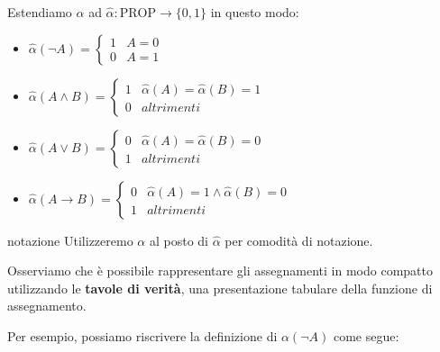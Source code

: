 \documentclass[a4paper,11pt]{report}
\begin{document}
    Estendiamo \( \alpha \) ad \( \hat{\alpha} : \text{PROP} \to \{0,1\} \) in questo modo:
            \vspace{0.5em}
    \begin{itemize}
        \item \( \hat{\alpha}(\neg A) = \begin{cases}
                1 &  A = 0 \\
                0 & A = 1
            \end{cases}\)

            \vspace{0.5em}

        \item \( \hat{\alpha}(A \land B) = \begin{cases}
                1 & \hat{\alpha}(A) = \hat{\alpha}(B)  = 1 \\
                0 & altrimenti
            \end{cases}\)

            \vspace{0.5em}

        \item \( \hat{\alpha}(A \lor B) = \begin{cases}
                0 & \hat{\alpha}(A) = \hat{\alpha}(B)  = 0 \\
                1 & altrimenti
            \end{cases}\)

            \vspace{0.5em}

        \item \( \hat{\alpha}(A \to B) = \begin{cases}
                0 & \hat{\alpha}(A) = 1 \land \hat{\alpha}(B)  = 0 \\
                1 & altrimenti
        \end{cases}\)

\end{itemize}

\begin{gbox}{notazione}
    Utilizzeremo \( \alpha \) al posto di \( \hat{\alpha} \) per comodità di notazione.
\end{gbox}
 
Osserviamo che è possibile rappresentare gli assegnamenti in modo compatto utilizzando le \textbf{tavole di verità}, una presentazione tabulare della funzione di assegnamento.

        Per esempio, possiamo riscrivere la definizione di \( \alpha(\neg A) \) come segue:
        
\end{document}
